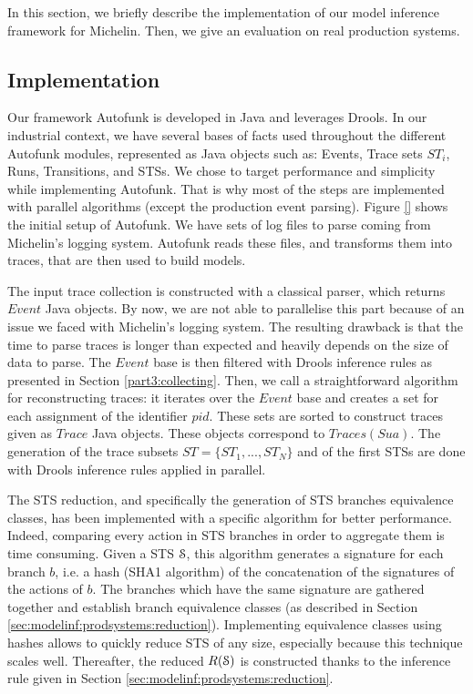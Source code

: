 In this section, we briefly describe the implementation of our
model inference framework for Michelin. Then, we give an
evaluation on real production systems.

\subsection{Implementation}
\label{sec:impl-exp-collect}

Our framework Autofunk is developed in Java and leverages Drools.
In our industrial context, we have several bases of facts used
throughout the different Autofunk modules, represented as Java
objects such as: Events, Trace sets $ST_i$, Runs, Transitions,
and STSs. We chose to target performance and simplicity while
implementing Autofunk. That is why most of the steps are
implemented with parallel algorithms (except the production event
parsing). Figure \ref{} shows the initial setup of Autofunk. We
have sets of log files to parse coming from Michelin's logging
system. Autofunk reads these files, and transforms them into
traces, that are then used to build models.


The input trace collection is constructed with a classical
parser, which returns $Event$ Java objects. By now, we are not
able to parallelise this part because of an issue we faced with
Michelin's logging system. The resulting drawback is that the
time to parse traces is longer than expected and heavily depends
on the size of data to parse. The $Event$ base is then filtered
with Drools inference rules as presented in Section
\ref{part3:collecting}.  Then, we call a straightforward
algorithm for reconstructing traces: it iterates over the $Event$
base and creates a set for each assignment of the identifier
$pid$. These sets are sorted to construct traces given as $Trace$
Java objects. These objects correspond to $Traces(Sua)$. The
generation of the trace subsets $ST= \{ST_1,...,ST_N\}$ and of
the first STSs are done with Drools inference rules applied in
parallel.

The STS reduction, and specifically the generation
of STS branches equivalence classes, has been implemented with a
specific algorithm for better performance. Indeed, comparing
every action in STS branches in order to aggregate them is time
consuming.  Given a STS $\EuScript{S}$, this algorithm generates
a signature for each branch $b$, i.e. a hash (SHA1 algorithm) of
the concatenation of the signatures of the actions of $b$. The
branches which have the same signature are gathered together and
establish branch equivalence classes (as described in Section
\ref{sec:modelinf:prodsystems:reduction}). Implementing
equivalence classes using hashes allows to quickly reduce STS of
any size, especially because this technique scales well.
Thereafter, the reduced $R(\EuScript{S})$ is constructed thanks
to the inference rule given in Section
\ref{sec:modelinf:prodsystems:reduction}.

